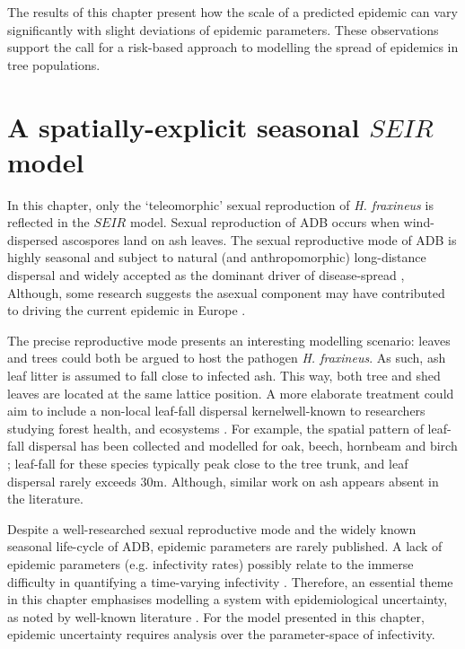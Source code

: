 The results of this chapter present how the scale of a predicted epidemic can vary significantly with slight deviations of epidemic parameters.
These observations support the call for a risk-based approach to modelling the spread of epidemics in tree populations.

\section{A spatially-explicit seasonal $SEIR$ model}
\label{sec:seir-model}

In this chapter, only the `teleomorphic' sexual reproduction of \textit{H. fraxineus} is reflected in the $SEIR$ model.
Sexual reproduction of ADB occurs when wind-dispersed ascospores land on ash leaves.
The sexual reproductive mode of ADB is highly seasonal and subject to natural (and anthropomorphic) long-distance dispersal \cite{grosdidier2018tracking} and 
widely accepted as the dominant driver of disease-spread \cite{https://doi.org/10.1111/ppa.12844, havnavckova2017direct, gross2012reproductive, Timmermann2011elal},
Although, some research suggests the asexual component may have contributed to driving the current epidemic in Europe \cite{fones2016role}.

The precise reproductive mode presents an interesting modelling scenario: leaves and trees could both be argued to host the pathogen \textit{H. fraxineus}.
As such, ash leaf litter is assumed to fall close to infected ash.
This way, both tree and shed leaves are located at the same lattice position.
A more elaborate treatment could aim to include a non-local leaf-fall dispersal kernel\textemdash well-known to researchers studying forest health, and ecosystems \cite{staelens2003model}.
For example, the spatial pattern of leaf-fall dispersal has been collected and modelled for oak, beech, hornbeam and birch \cite{nickmans2019modelling};
leaf-fall for these species typically peak close to the tree trunk, and leaf dispersal rarely exceeds $30\mathrm{m}$.
Although, similar work on ash appears absent in the literature.

Despite a well-researched sexual reproductive mode and the widely known seasonal life-cycle of ADB, epidemic parameters are rarely published.
A lack of epidemic parameters (e.g. infectivity rates) possibly relate to the immerse difficulty in quantifying a time-varying infectivity \cite{13-challenges}.
Therefore, an essential theme in this chapter emphasises modelling a system with epidemiological uncertainty, 
as noted by well-known literature \cite{13-challenges, WEBIDEMICS}.
For the model presented in this chapter, epidemic uncertainty requires analysis over the parameter-space of infectivity.

